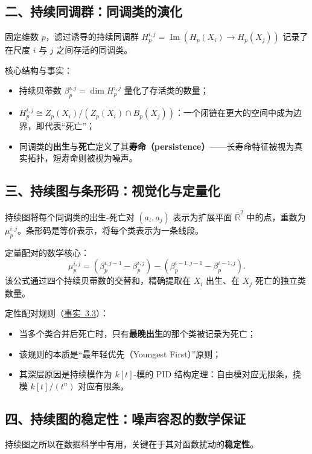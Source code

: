\documentclass[UTF8]{ctexart}
\begin{document}
\subsection*{二、持续同调群：同调类的演化}

固定维数 \(p\)，滤过诱导的持续同调群 \(H_p^{i,j} = \operatorname{Im}(H_p(X_i) \to H_p(X_j))\) 记录了在尺度 \(i\) 与 \(j\) 之间存活的同调类。

核心结构与事实：
\begin{itemize}
    \item 持续贝蒂数 \(\beta_p^{i,j} = \dim H_p^{i,j}\) 量化了存活类的数量；
    \item \(H_p^{i,j} \cong Z_p(X_i) / (Z_p(X_i) \cap B_p(X_j))\)：一个闭链在更大的空间中成为边界，即代表“死亡”；
    \item 同调类的\textbf{出生}与\textbf{死亡}定义了其\textbf{寿命（persistence）}——长寿命特征被视为真实拓扑，短寿命则被视为噪声。
\end{itemize}

\subsection*{三、持续图与条形码：视觉化与定量化}

持续图将每个同调类的出生-死亡对 \((a_i, a_j)\) 表示为扩展平面 \(\bar{\mathbb{R}}^2\) 中的点，重数为 \(\mu_p^{i,j}\)。条形码是等价表示，将每个类表示为一条线段。

定量配对的数学核心：
\[
\mu_p^{i,j} = \left(\beta_p^{i,j-1} - \beta_p^{i,j}\right) - \left(\beta_p^{i-1,j-1} - \beta_p^{i-1,j}\right).
\]
该公式通过四个持续贝蒂数的交替和，精确提取在 \(X_i\) 出生、在 \(X_j\) 死亡的独立类数量。

定性配对规则（\hyperref[fact:youngest-first]{事实~3.3}）：
\begin{itemize}
    \item 当多个类合并后死亡时，只有\textbf{最晚出生}的那个类被记录为死亡；
    \item 该规则的本质是“最年轻优先（Youngest First）”原则；
    \item 其深层原因是持续模作为 \(k[t]\)-模的 PID 结构定理：自由模对应无限条，挠模 \(k[t]/(t^n)\) 对应有限条。
\end{itemize}

\subsection*{四、持续图的稳定性：噪声容忍的数学保证}

持续图之所以在数据科学中有用，关键在于其对函数扰动的\textbf{稳定性}。
\end{document}
